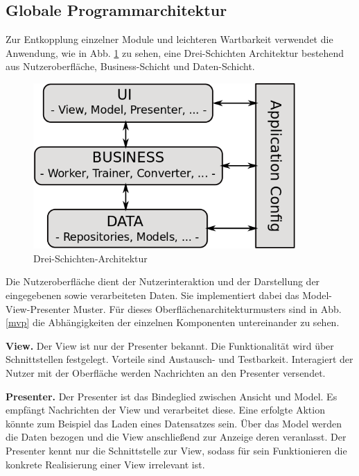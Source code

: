 \subsection{Globale Programmarchitektur}

Zur Entkopplung einzelner Module und leichteren Wartbarkeit verwendet die Anwendung, wie in Abb. \ref{Drei-Schichten-Architektur} zu sehen, eine Drei-Schichten Architektur bestehend aus Nutzeroberfläche, Business-Schicht und Daten-Schicht.
\begin{figure}[H]
\begin{center}
\includegraphics[width=10cm]{Abbildungen/UML/jan/SchichtenModel.png}
\caption{Drei-Schichten-Architektur} 
\label{Drei-Schichten-Architektur}
\end{center}
\end{figure}

Die Nutzeroberfläche dient der Nutzerinteraktion und der Darstellung der eingegebenen sowie verarbeiteten Daten. Sie implementiert dabei das Model-View-Presenter Muster. Für dieses Oberflächenarchitekturmusters sind in Abb. \ref{mvp} die Abhängigkeiten der einzelnen Komponenten untereinander zu sehen.

\textbf{View.} Der View ist nur der Presenter bekannt. Die Funktionalität wird über Schnittstellen festgelegt. Vorteile sind Austausch- und Testbarkeit. Interagiert der Nutzer mit der Oberfläche werden Nachrichten an den Presenter versendet.

\textbf{Presenter.} Der Presenter ist das Bindeglied zwischen Ansicht und Model. Es empfängt Nachrichten der View und verarbeitet diese. Eine erfolgte Aktion könnte zum Beispiel das Laden eines Datensatzes sein. Über das Model werden die Daten bezogen und die View anschließend zur Anzeige deren veranlasst. Der Presenter kennt nur die Schnittstelle zur View, sodass für sein Funktionieren die konkrete Realisierung einer View irrelevant ist.

